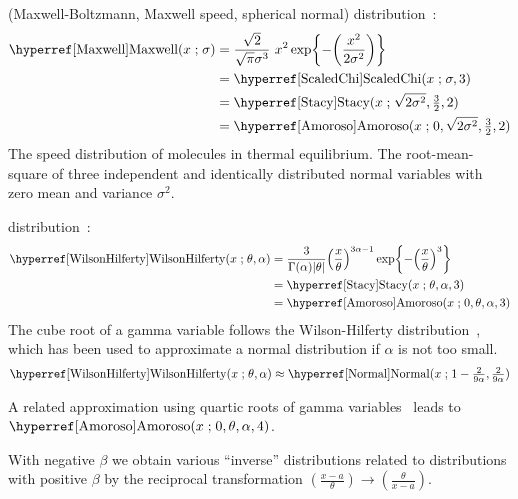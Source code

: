  (Maxwell-Boltzmann, Maxwell speed, spherical normal) distribution~\cite{Maxwell1860, Abramowitz1965}:
%
\begin{align}
\label{Maxwell}
\opr{Maxwell}(x \given \sigma) 
&= \frac{\sqrt{2}}{\sqrt{\pi} \sigma^3}\ x^2 \exp\Left\{-\Left(\frac{x^2}{2\sigma^2}\Right)\Right\}  \checked
 \\
&=\opr{ScaledChi}(x \given \sigma, 3) \checked \notag \\
&=  \opr{Stacy}(x\given  \sqrt{2\sigma^2} ,\tfrac{3}{2},2) \notag  \checked\\
&=  \opr{Amoroso}(x\given  0, \sqrt{2\sigma^2} , \tfrac{3}{2}, 2) \notag  \checked
\end{align}
The speed distribution of molecules in thermal equilibrium. The root-mean-square of three independent and identically distributed normal variables with zero mean and variance $\sigma^2$.



 distribution~\cite{Wilson1931,Johnson1994}:
\begin{align}
\label{WilsonHilferty}
\opr{WilsonHilferty}(x \given \theta, \alpha) 
&= \frac{3}{\Gamma(\alpha)|\theta|} \Left(\frac{x}{\theta}\Right)^{3 \alpha-1} \exp\Left\{-\Left(\frac{x}{\theta}\Right)^{3}\Right\}
\checked
\\ 
&=  \opr{Stacy}(x\given \theta, \alpha, 3) \checked
\notag 
\\ &=  \opr{Amoroso}(x\given  0, \theta, \alpha, 3) \checked
\notag
\end{align}
The cube root of a gamma variable follows the Wilson-Hilferty distribution~\cite{Wilson1931}, which has been used to approximate a normal distribution if $\alpha$ is not too small.
\[
\opr{WilsonHilferty}(x \given \theta, \alpha)  \approx \opr{Normal}(x \given 1-\sfrac{2}{9\alpha},  \sfrac{2}{9\alpha} )
\checked
\notag
\]


A related approximation using quartic roots of gamma variables~\cite{Hawkins1986} leads to   $\opr{Amoroso}(x\given  0, \theta, \alpha, 4)$.





With negative $\beta$ we obtain various ``inverse'' distributions related to distributions with positive $\beta$ by the reciprocal transformation $ (\tfrac{x-a}{\theta} ) \to (\tfrac{\theta}{x-a} )$.



